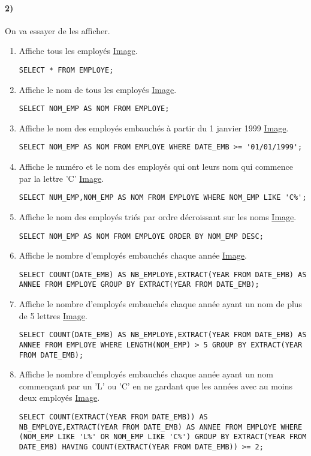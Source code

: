 \documentclass{report}
\begin{document}
\paragraph{2)}On va essayer de les afficher.
\begin{enumerate}
	\item Affiche tous les employés \href{run:./Images/TP4/tp4_1.png}{Image}.
	\begin{lstlisting}
SELECT * FROM EMPLOYE;
	\end{lstlisting}
	\item Affiche le nom de tous les employés \href{run:./Images/TP4/tp4_2.png}{Image}.
	\begin{lstlisting}
SELECT NOM_EMP AS NOM FROM EMPLOYE;
	\end{lstlisting}
	\item Affiche le nom des employés embauchés à partir du 1 janvier 1999 \href{run:./Images/TP4/tp4_3.png}{Image}.
	\begin{lstlisting}
SELECT NOM_EMP AS NOM FROM EMPLOYE WHERE DATE_EMB >= '01/01/1999';
	\end{lstlisting}
	\item Affiche le numéro et le nom des employés qui ont leurs nom qui commence par la lettre 'C' \href{run:./Images/TP4/tp4_4.png}{Image}.
	\begin{lstlisting}
SELECT NUM_EMP,NOM_EMP AS NOM FROM EMPLOYE WHERE NOM_EMP LIKE 'C%';
	\end{lstlisting}
	\item Affiche le nom des employés triés par ordre décroissant sur les noms \href{run:./Images/TP4/tp4_5.png}{Image}.
	\begin{lstlisting}
SELECT NOM_EMP AS NOM FROM EMPLOYE ORDER BY NOM_EMP DESC;
	\end{lstlisting}
	\item Affiche le nombre d'employés embauchés chaque année \href{run:./Images/TP4/tp4_6.png}{Image}.
	\begin{lstlisting}
SELECT COUNT(DATE_EMB) AS NB_EMPLOYE,EXTRACT(YEAR FROM DATE_EMB) AS ANNEE FROM EMPLOYE GROUP BY EXTRACT(YEAR FROM DATE_EMB);
	\end{lstlisting}
	\item Affiche le nombre d'employés embauchés chaque année ayant un nom de plus de 5 lettres \href{run:./Images/TP4/tp4_7.png}{Image}.
	\begin{lstlisting}
SELECT COUNT(DATE_EMB) AS NB_EMPLOYE,EXTRACT(YEAR FROM DATE_EMB) AS ANNEE FROM EMPLOYE WHERE LENGTH(NOM_EMP) > 5 GROUP BY EXTRACT(YEAR FROM DATE_EMB);
	\end{lstlisting}
	\item Affiche le nombre d'employés embauchés chaque année ayant un nom commençant par un 'L' ou 'C' en ne gardant que les années avec au moins deux employés \href{run:./Images/TP4/tp4_8.png}{Image}.
	\begin{lstlisting}
SELECT COUNT(EXTRACT(YEAR FROM DATE_EMB)) AS NB_EMPLOYE,EXTRACT(YEAR FROM DATE_EMB) AS ANNEE FROM EMPLOYE WHERE (NOM_EMP LIKE 'L%' OR NOM_EMP LIKE 'C%') GROUP BY EXTRACT(YEAR FROM DATE_EMB) HAVING COUNT(EXTRACT(YEAR FROM DATE_EMB)) >= 2;
	\end{lstlisting}
\end{enumerate}
\end{document}
